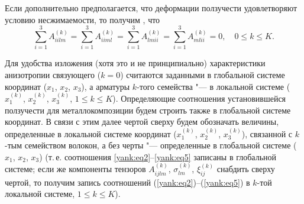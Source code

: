 Если дополнительно предполагается, что деформации ползучести удовлетворяют
условию несжимаемости, то получим \cite{yank:bib3}, что
\begin{equation}
\label{yank:eq5}
\sum\limits_{i=1}^3 A_{iilm}^{(k)}
=\sum\limits_{i=1}^3 A_{iiml}^{(k)} = \sum\limits_{i=1}^3
A_{lmii}^{(k)} = \sum\limits_{i=1}^3 A_{mlii}^{(k)}
=0,\quad 0\le k\le K.
\end{equation}

Для удобства изложения (хотя это и не принципиально) характеристики
анизотропии связующего ($k=0$) считаются заданными в глобальной системе
координат ($x_1$, $x_2$, $x_3$), а арматуры $k$-того семейства "--- в локальной
системе ($x_1^{(k)}$, $x_2^{(k)}$, $x_3^{(k)}$, $1\le k\le K$).
Определяющие соотношения установившейся ползучести для металлокомпозиции
будем строить также в глобальной системе координат. В связи с этим далее
чертой сверху будем обозначать величины, определенные в локальной системе
координат ($x_1^{(k)}$, $x_2^{(k)}$, $x_3^{(k)}$), связанной с $k$-тым
семейством волокон, а без черты "--- определенные в глобальной системе ($x_1$, $x_2$, $x_3$) (т.\,е. соотношения
\eqref{yank:eq2}--\eqref{yank:eq5} записаны в глобальной
системе; если же компоненты тензоров $A_{ijlm}^{(k)}$, $\sigma _{lm}^{(k)}$, $\xi _{ij}^{(k)} $ снабдить сверху чертой, то получим запись соотношений
(\ref{yank:eq2})--(\ref{yank:eq5}) в $k$-той локальной системе, $1\le k\le K$).

